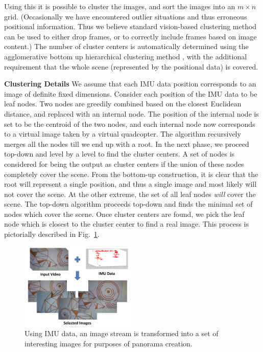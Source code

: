 \documentclass[10pt,twocolumn,letterpaper]{article}
\begin{document}
Using this it is possible to cluster the images, and sort the images
into an $m\times n$ grid.  (Occasionally we have encountered outlier
situations and thus erroneous positional information.  Thus we believe
standard vision-based clustering method can be used to either drop
frames, or to correctly include frames based on image content.)  The
number of cluster centers is automatically determined using the
agglomerative bottom up hierarchical clustering method \cite{Lior}, with the
additional requirement that the whole scene (represented by the
positional data) is covered.  

{\bf Clustering Details} We assume that each IMU data position
corresponds to an image of definite fixed dimensions.  Consider each
position of the IMU data to be leaf nodes. Two nodes are greedily
combined based on the closest Euclidean distance, and replaced with an
internal node.  The position of the internal node is set to be the
centroid of the two nodes, and each internal node now corresponds to a
virtual image taken by a virtual quadcopter.  The algorithm
recursively merges all the nodes till we end up with a root.  In the
next phase, we proceed top-down and level by a level to find the
cluster centers.  A set of nodes is considered for being the output as
cluster centers if the union of these nodes completely cover the
scene. From the bottom-up construction, it is clear that the root will
represent a single position, and thus a single image and most likely
will not cover the scene.  At the other extreme, the set of all leaf
nodes \emph{will} cover the scene.  The top-down algorithm proceeds
top-down and finds the minimal set of nodes which cover the scene.
Once cluster centers are found, we pick the leaf node which is closest
to the cluster center to find a real image.
This process is pictorially described in
Fig.~\ref{fig:selection}.


\begin{figure}[h!]
  \centering
  \includegraphics[width=0.49\textwidth]{figures/selection} 
  \caption{ \label{fig:selection} Using IMU data, an image stream is
    transformed into a set of interesting images for purposes of
    panorama creation. }
\end{figure}    
\end{document}
